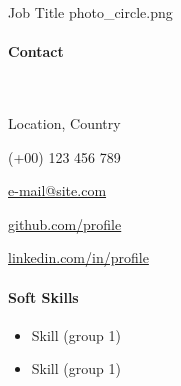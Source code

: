 \documentclass[color]{resume-twopanels}
\begin{document}
\begin{resume}

    {Job Title}
    {photo\_circle.png}

    \begin{leftpanel}

        \paragraph{Contact} \ \vspace{1em} %

            \begin{description}[left=1em]

                {Location, Country}

                {(+00) 123 456 789}

                {\url{e-mail@site.com}}

                \url{github.com/profile}

                \url{linkedin.com/in/profile}
            \end{description}


        \paragraph{Soft Skills}

            \begin{itemize}
                \item Skill (group 1)
                \item Skill (group 1)
                \vspace{1em}


\end{itemize}
\end{leftpanel}
\end{resume}
\end{document}
